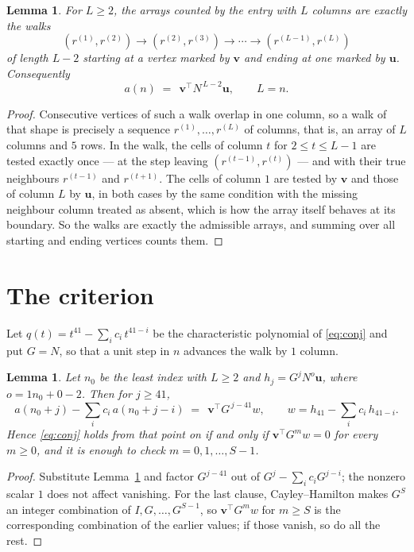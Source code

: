 \documentclass[11pt,a4paper]{article}
\theoremstyle{plain}
\newtheorem{lemma}[theorem]{Lemma}
\theoremstyle{definition}
\begin{document}
\begin{lemma}\label{lem:walk}
For $L\ge2$, the arrays counted by the entry with $L$ columns are exactly the walks
\[
(r^{(1)},r^{(2)})\to(r^{(2)},r^{(3)})\to\cdots\to(r^{(L-1)},r^{(L)})
\]
of length $L-2$ starting at a vertex marked by $\mathbf{v}$ and ending at one marked by
$\mathbf{u}$. Consequently
\[
a(n)\;=\;\,\mathbf{v}^{\!\top}N^{\,L-2}\mathbf{u},\qquad L=n .
\]
\end{lemma}

\begin{proof}
Consecutive vertices of such a walk overlap in one column, so a walk of that shape is
precisely a sequence $r^{(1)},\dots,r^{(L)}$ of columns, that is, an array of $L$ columns
and $5$ rows. In the walk, the cells of column $t$ for $2\le t\le L-1$ are tested
exactly once --- at the step leaving $(r^{(t-1)},r^{(t)})$ --- and with their true
neighbours $r^{(t-1)}$ and $r^{(t+1)}$. The cells of column $1$ are tested by
$\mathbf{v}$ and those of column $L$ by $\mathbf{u}$, in both cases by the same condition
with the missing neighbour column treated as absent, which is how the array itself behaves at
its boundary. So the walks are exactly the admissible arrays, and summing over all starting
and ending vertices counts them.
\end{proof}

\section{The criterion}

Let $q(t)=t^{41}-\sum_i c_i\,t^{41-i}$ be the characteristic polynomial of
\eqref{eq:conj} and put $G=N$, so that a unit step in $n$ advances the walk by
$1$ column.

\begin{lemma}\label{lem:crit}
Let $n_0$ be the least index with $L\ge2$ and $h_j=G^{j}N^{o}\mathbf{u}$, where
$o=1n_0+0-2$. Then for $j\ge41$,
\[
a(n_0+j)-\sum_i c_i\,a(n_0+j-i)\;=\;\,\mathbf{v}^{\!\top}G^{\,j-41}w,
\qquad w=h_{41}-\sum_i c_i\,h_{41-i} .
\]
Hence \eqref{eq:conj} holds from that point on if and only if
$\mathbf{v}^{\!\top}G^{m}w=0$ for every $m\ge0$, and it is enough to check
$m=0,1,\dots,S-1$.
\end{lemma}

\begin{proof}
Substitute Lemma~\ref{lem:walk} and factor $G^{j-41}$ out of
$G^{j}-\sum_ic_iG^{j-i}$; the nonzero scalar $1$ does not affect
vanishing. For the last clause, Cayley--Hamilton makes $G^{S}$ an integer combination of
$I,G,\dots,G^{S-1}$, so $\mathbf{v}^{\!\top}G^{m}w$ for $m\ge S$ is the corresponding
combination of the earlier values; if those vanish, so do all the rest.
\end{proof}
\end{document}
